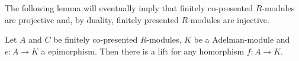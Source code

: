 The following lemma will eventually imply that finitely co-presented $R$-modules are projective and, by duality, finitely presented $R$-modules are injective.

\begin{lemma}
  \label{maps-into-coherent-lift}
  Let $A$ and $C$ be finitely co-presented $R$-modules, $K$ be a Adelman-module and $e:A\to K$ a epimorphism.
  Then there is a lift for any homorphism $f:A\to K$.
    \begin{center}
    \end{center}
\end{lemma}

